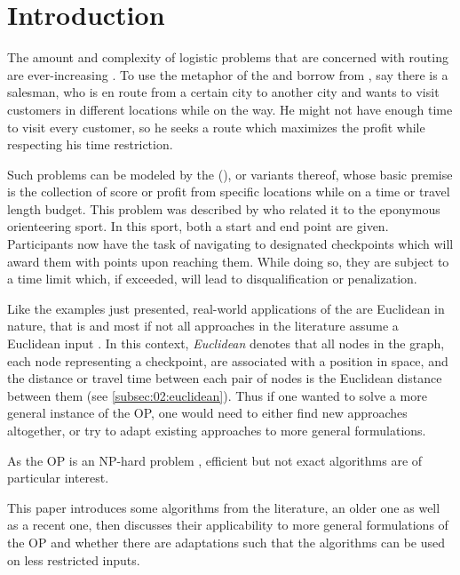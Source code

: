 \section{Introduction}
\label{sec:01:introduction}

The amount and complexity of logistic problems that are concerned with routing are ever-increasing \cite{stein_top_2021}.
To use the metaphor of the \tsplong{} and borrow from \citeauthor{chao_fast_1996} \cite{chao_fast_1996},
say there is a salesman, who is en route from a certain city to another city and wants to visit customers in different locations while on the way.
He might not have enough time to visit every customer, so he seeks a route which maximizes the profit while respecting his time restriction.

Such problems can be modeled by the \oplong{} (\op{}), or variants thereof,
whose basic premise is the collection of score or profit from specific locations while on a time or travel length budget.
This problem was described by \citeauthor{tsiligiridis_heuristic_1984} \cite{tsiligiridis_heuristic_1984} who related it to the eponymous orienteering sport.
In this sport, both a start and end point are given. Participants now have the task of navigating to designated checkpoints which will award them with points upon reaching them.
While doing so, they are subject to a time limit which, if exceeded, will lead to disqualification or penalization.

Like the examples just presented, real-world applications of the \op{} are Euclidean in nature, that is and most if not all approaches in the literature assume a Euclidean input \cite{vansteenwegen_orienteering_2011}. 
In this context, \emph{Euclidean} denotes that all nodes in the graph, each node representing a checkpoint, are associated with a position in space, and the distance or travel time between each pair of nodes is the Euclidean distance between them (see \cref{subsec:02:euclidean}).
Thus if one wanted to solve a more general instance of the OP, one would need to either find new approaches altogether,
or try to adapt existing approaches to more general formulations.

As the OP is an NP-hard problem \cite{golden_orienteering_1987}, efficient but not exact algorithms are of particular interest.

This paper introduces some algorithms from the literature, an older one as well as a recent one,
then discusses their applicability to more general formulations of the OP
and whether there are adaptations such that the algorithms can be used on less restricted inputs.
